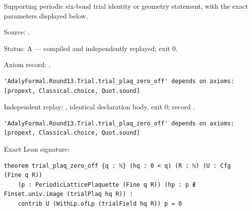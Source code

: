 \begin{theorem}[bp-392]
\label{bp-392}
\leanok
Supporting periodic six-bond trial identity or geometry statement, with the exact parameters displayed below.

\par Source: \texttt{}.
\par Status: A — compiled and independently replayed; exit 0.
\par Axiom record: \texttt{}.
\begin{verbatim}
'AdalyFormal.Round13.Trial.trial_plaq_zero_off' depends on axioms: [propext, Classical.choice, Quot.sound]
\end{verbatim}
\par Independent replay: \texttt{}, identical declaration body, exit 0; record \texttt{}.
\begin{verbatim}
'AdalyFormal.Round13.Trial.trial_plaq_zero_off' depends on axioms: [propext, Classical.choice, Quot.sound]
\end{verbatim}
\par Exact Lean signature:
\begin{verbatim}
theorem trial_plaq_zero_off {q : ℕ} (hq : 0 < q) (R : ℕ) (U : Cfg (Fine q R))
    (p : PeriodicLatticePlaquette (Fine q R)) (hp : p ∉ Finset.univ.image (trialPlaq hq R)) :
    contrib U (WithLp.ofLp (trialField hq R)) p = 0
\end{verbatim}
\end{theorem}


